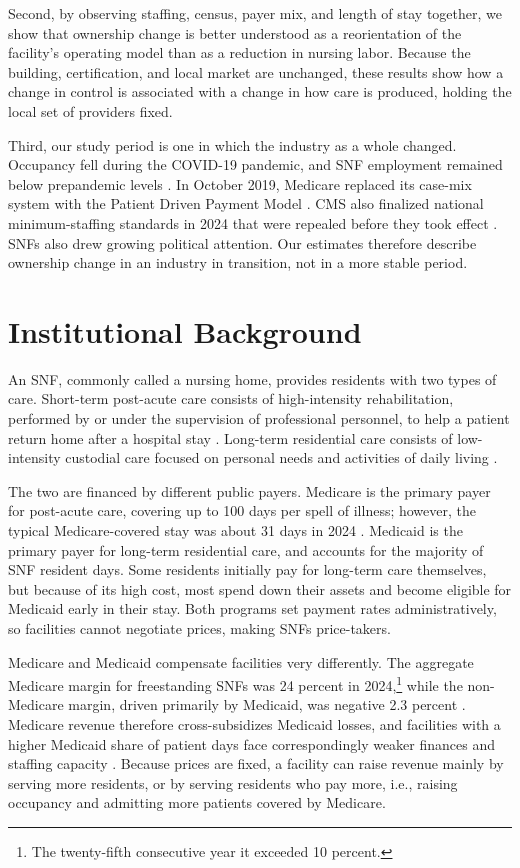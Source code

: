 \documentclass[12pt]{article}
\begin{document}
Second, by observing staffing, census, payer mix, and length of stay together, we show that ownership change is better understood as a reorientation of the facility's operating model than as a reduction in nursing labor. Because the building, certification, and local market are unchanged, these results show how a change in control is associated with a change in how care is produced, holding the local set of providers fixed.

Third, our study period is one in which the industry as a whole changed. Occupancy fell during the COVID-19 pandemic, and SNF employment remained below prepandemic levels \citep{MedPAC2026Report}. In October 2019, Medicare replaced its case-mix system with the Patient Driven Payment Model \citep{cms_2018_pdpm}. CMS also finalized national minimum-staffing standards in 2024 that were repealed before they took effect \citep{cms_2024_min_staffing, cms_2025_staffing_repeal}. SNFs also drew growing political attention. Our estimates therefore describe ownership change in an industry in transition, not in a more stable period.

\section{Institutional Background} \label{sec:background}

An SNF, commonly called a nursing home, provides residents with two types of care. Short-term post-acute care consists of high-intensity rehabilitation, performed by or under the supervision of professional personnel, to help a patient return home after a hospital stay \citep{CMSBenefitManualCh8}. Long-term residential care consists of low-intensity custodial care focused on personal needs and activities of daily living \citep{CMSBenefitManualCh16}. 

The two are financed by different public payers. Medicare is the primary payer for post-acute care, covering up to 100 days per spell of illness; however, the typical Medicare-covered stay was about 31 days in 2024 \citep{MedPAC2026Report}. Medicaid is the primary payer for long-term residential care, and accounts for the majority of SNF resident days. Some residents initially pay for long-term care themselves, but because of its high cost, most spend down their assets and become eligible for Medicaid early in their stay. Both programs set payment rates administratively, so facilities cannot negotiate prices, making SNFs price-takers.

Medicare and Medicaid compensate facilities very differently. The aggregate Medicare margin for freestanding SNFs was 24 percent in 2024,\footnote{The twenty-fifth consecutive year it exceeded 10 percent.} while the non-Medicare margin, driven primarily by Medicaid, was negative 2.3 percent \citep{MedPAC2026Report}. Medicare revenue therefore cross-subsidizes Medicaid losses, and facilities with a higher Medicaid share of patient days face correspondingly weaker finances and staffing capacity \citep{bowblis_brunt_2025}. Because prices are fixed, a facility can raise revenue mainly by serving more residents, or by serving residents who pay more, i.e., raising occupancy and admitting more patients covered by Medicare.
\end{document}
